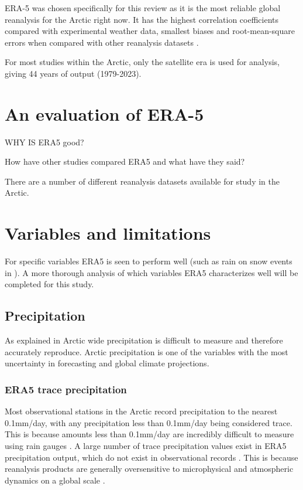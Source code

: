 \documentclass[12pt, oneside]{article}
\begin{document}
ERA-5 was chosen specifically for this review as it is the most reliable global reanalysis for the Arctic right now. It has the highest correlation coefficients compared with experimental weather data, smallest biases and root-mean-square errors when compared with other reanalysis datasets \cite{graham2019improved, hillebrand2021comparison}. 

For most studies within the Arctic, only the satellite era is used for analysis, giving 44 years of output (1979-2023).




\section{An evaluation of ERA-5}
WHY IS ERA5 good?

How have other studies compared ERA5 and what have they said?

There are a number of different reanalysis datasets available for study in the Arctic. 



\section{Variables and limitations}\label{Hydrological variables and limitations }
For specific variables ERA5 is seen to perform well (such as rain on snow events in \cite{dou2021trends}). A more thorough analysis of which variables ERA5 characterizes well will be completed for this study.


\subsection{Precipitation}\label{precipitation}
As explained in \cite{boisvert2018intercomparison} Arctic wide precipitation is difficult to measure and therefore accurately reproduce. Arctic precipitation is one of the variables with the most uncertainty in forecasting and global climate projections. 

\subsubsection{ERA5 trace precipitation}\label{traceprecip}
Most observational stations in the Arctic record precipitation to the nearest 0.1mm/day, with any precipitation less than 0.1mm/day being considered trace. This is because amounts less than 0.1mm/day are incredibly difficult to measure using rain gauges \cite[p.~3-50]{meteorological2015manobs}. A large number of trace precipitation values exist in ERA5 precipitation output, which do not exist in observational records \cite{shen2022performance}. This is because reanalysis products are generally oversensitive to microphysical and atmospheric dynamics on a global scale \cite{boisvert2018intercomparison}. 
\end{document}
